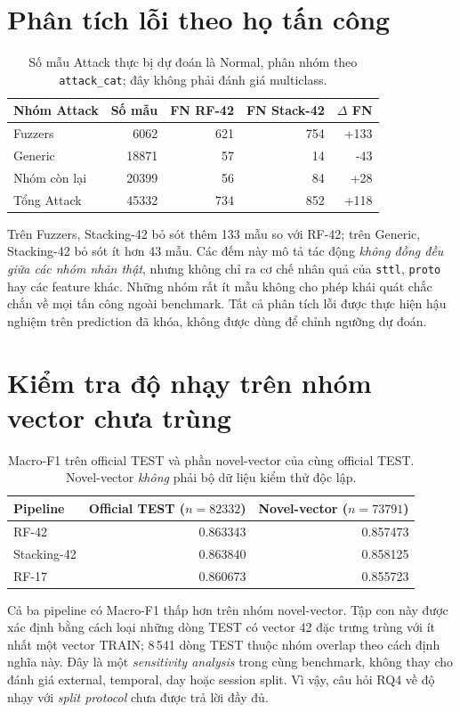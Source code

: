 \section{Phân tích lỗi theo họ tấn công}
\label{sec:attack-family-error}

\begin{table}[htbp]
\centering
\small
\caption{Số mẫu Attack thực bị dự đoán là Normal, phân nhóm theo \texttt{attack\_cat}; đây không phải đánh giá multiclass.}
\label{tab:attack-family}
\begin{tabular}{lrrrr}
\hline
Nhóm Attack & Số mẫu & FN RF-42 & FN Stack-42 & $\Delta$ FN \\
\hline
Fuzzers       & 6062  & 621 & 754 & +133 \\
Generic       & 18871 & 57  & 14  & -43 \\
Nhóm còn lại  & 20399 & 56  & 84  & +28 \\
\hline
Tổng Attack   & 45332 & 734 & 852 & +118 \\
\hline
\end{tabular}
\end{table}

Trên Fuzzers, Stacking-42 bỏ sót thêm 133 mẫu so với RF-42; trên Generic, Stacking-42 bỏ sót ít hơn 43 mẫu. Các đếm này mô tả tác động \emph{không đồng đều giữa các nhóm nhãn thật}, nhưng không chỉ ra cơ chế nhân quả của \texttt{sttl}, \texttt{proto} hay các feature khác. Những nhóm rất ít mẫu không cho phép khái quát chắc chắn về mọi tấn công ngoài benchmark. Tất cả phân tích lỗi được thực hiện hậu nghiệm trên prediction đã khóa, không được dùng để chỉnh ngưỡng dự đoán.

\section{Kiểm tra độ nhạy trên nhóm vector chưa trùng}
\label{sec:novel-vector}

\begin{table}[htbp]
\centering
\small
\caption{Macro-F1 trên official TEST và phần novel-vector của cùng official TEST. Novel-vector \emph{không} phải bộ dữ liệu kiểm thử độc lập.}
\label{tab:novel-vector}
\begin{tabular}{lrr}
\hline
Pipeline & Official TEST ($n=82332$) & Novel-vector ($n=73791$) \\
\hline
RF-42       & 0.863343 & 0.857473 \\
Stacking-42 & 0.863840 & 0.858125 \\
RF-17       & 0.860673 & 0.855723 \\
\hline
\end{tabular}
\end{table}

Cả ba pipeline có Macro-F1 thấp hơn trên nhóm novel-vector. Tập con này được xác định bằng cách loại những dòng TEST có vector 42 đặc trưng trùng với ít nhất một vector TRAIN; 8\,541 dòng TEST thuộc nhóm overlap theo cách định nghĩa này. Đây là một \emph{sensitivity analysis} trong cùng benchmark, không thay cho đánh giá external, temporal, day hoặc session split. Vì vậy, câu hỏi RQ4 về độ nhạy với \emph{split protocol} chưa được trả lời đầy đủ.
